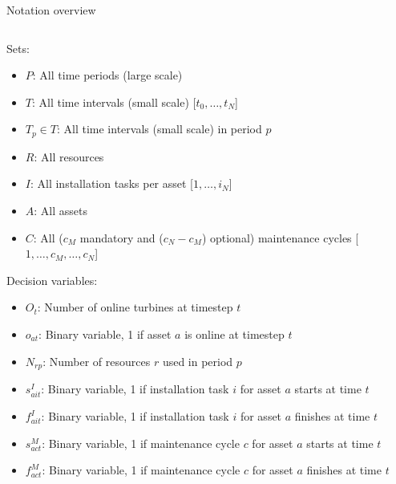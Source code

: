 \documentclass{beamer}
\begin{document}
\begin{frame}{Notation overview}
\tiny

\begin{columns}
\begin{column}{.48\textwidth}
Sets:
\begin{itemize}
\item $P$: All time periods (large scale)
\item $T$: All time intervals (small scale) [$t_0, \dots , t_N$]
\item $T_p \in T$: All time intervals (small scale) in period $p$
\item $R$: All resources
\item $I$: All installation tasks per asset [$1, \dots , i_N$]
\item $A$: All assets
\item $C$: All ($c_M$ mandatory and ($c_N - c_M$) optional) maintenance cycles [$1, \dots , c_M, \dots , c_N$]
\end{itemize}

Decision variables:
\begin{itemize}
\item $O_{t}$: Number of online turbines at timestep $t$
\item $o_{at}$: Binary variable, 1 if asset $a$ is online at timestep $t$
\item $N_{rp}$: Number of resources $r$ used in period $p$
\item $s^I_{ait}$: Binary variable, 1 if installation task $i$ for asset $a$ starts at time $t$
\item $f^I_{ait}$: Binary variable, 1 if installation task $i$ for asset $a$ finishes at time $t$
\item $s^M_{act}$: Binary variable, 1 if maintenance cycle $c$ for asset $a$ starts at time $t$
\item $f^M_{act}$: Binary variable, 1 if maintenance cycle $c$ for asset $a$ finishes at time $t$
\end{itemize}
\end{column}

\hfill


\end{columns}
\end{frame}
\end{document}
